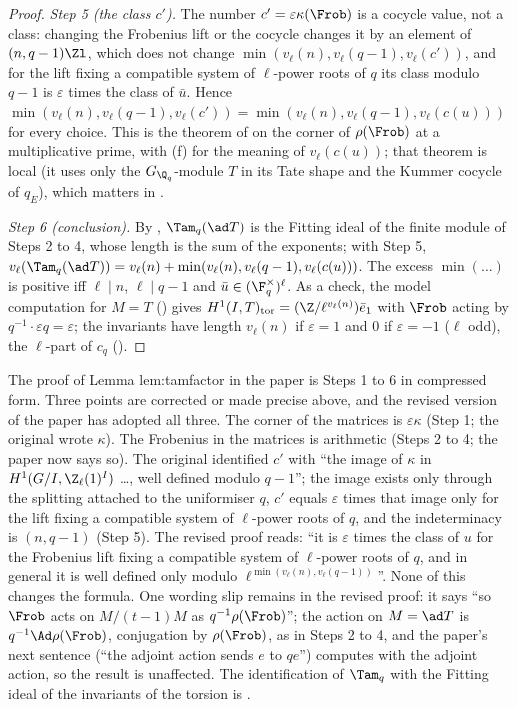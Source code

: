 \begin{proof}
\emph{Step 5 (the class $c'$).} The number $c'=\varepsilon\kappa(\Frob)$ is a cocycle value, not a class: changing the Frobenius lift or the cocycle changes it by an element
of $(n,q-1)\Zl$, which does not change $\min(v_\ell(n),v_\ell(q-1),v_\ell(c'))$, and for the lift fixing a compatible system of $\ell$-power roots of $q$ its class modulo $q-1$
is $\varepsilon$ times the class of $\bar u$. Hence $\min(v_\ell(n),v_\ell(q-1),v_\ell(c'))=\min(v_\ell(n),v_\ell(q-1),v_\ell(c(u)))$ for every choice. This is the theorem of
 on the corner of $\rho(\Frob)$ at a multiplicative prime, with (f) for the meaning of $v_\ell(c(u))$; that theorem is local (it uses
only the $G_{\Q_q}$-module $T$ in its Tate shape and the Kummer cocycle of $q_E$), which matters in .

\emph{Step 6 (conclusion).} By , $\Tam_q(\ad T)$ is the Fitting ideal of the finite module of Steps 2 to 4, whose length is the sum of the
exponents; with Step 5, $v_\ell(\Tam_q(\ad T))=v_\ell(n)+\min(v_\ell(n),v_\ell(q-1),v_\ell(c(u)))$. The excess $\min(\dots)$ is positive iff $\ell\mid n$, $\ell\mid q-1$ and
$\bar u\in(\F_q^\times)^\ell$. As a check, the model computation for $M=T$ () gives $H^1(I,T)_{\mathrm{tor}}=(\Z/\ell^{v_\ell(n)})\bar e_1$ with $\Frob$ acting by
$q^{-1}\cdot\varepsilon q=\varepsilon$; the invariants have length $v_\ell(n)$ if $\varepsilon=1$ and $0$ if $\varepsilon=-1$ ($\ell$ odd), the $\ell$-part of $c_q$ ().
\end{proof}

\begin{paperlink}
The proof of Lemma lem:tamfactor in the paper is Steps 1 to 6 in compressed form. Three points are corrected or made precise above, and the revised
version of the paper has adopted all three. The corner of the matrices is $\varepsilon\kappa$ (Step 1; the original wrote $\kappa$). The Frobenius in the matrices is
arithmetic (Steps 2 to 4; the paper now says so). The original identified $c'$ with ``the image of $\kappa$ in $H^1(G/I,\Z_\ell(1)^I)$ \dots, well defined modulo $q-1$''; the image
exists only through the splitting attached to the uniformiser $q$, $c'$ equals $\varepsilon$ times that image only for the lift fixing a compatible system of $\ell$-power roots of $q$, and the indeterminacy is
$(n,q-1)$ (Step 5). The revised proof reads: ``it is $\varepsilon$ times the class of $u$ for the Frobenius lift fixing a compatible system of $\ell$-power roots of $q$, and in
general it is well defined only modulo $\ell^{\min(v_\ell(n),v_\ell(q-1))}$''. None of this changes the formula. One wording slip remains in the revised proof: it
says ``so $\Frob$ acts on $M/(t-1)M$ as $q^{-1}\rho(\Frob)$''; the action on $M=\ad T$ is $q^{-1}\Ad\rho(\Frob)$, conjugation by $\rho(\Frob)$, as in Steps 2 to 4, and the
paper's next sentence (``the adjoint action sends $e$ to $qe$'') computes with the adjoint action, so the result is unaffected. The identification of $\Tam_q$ with the Fitting ideal of the
invariants of the torsion is .
\end{paperlink}

